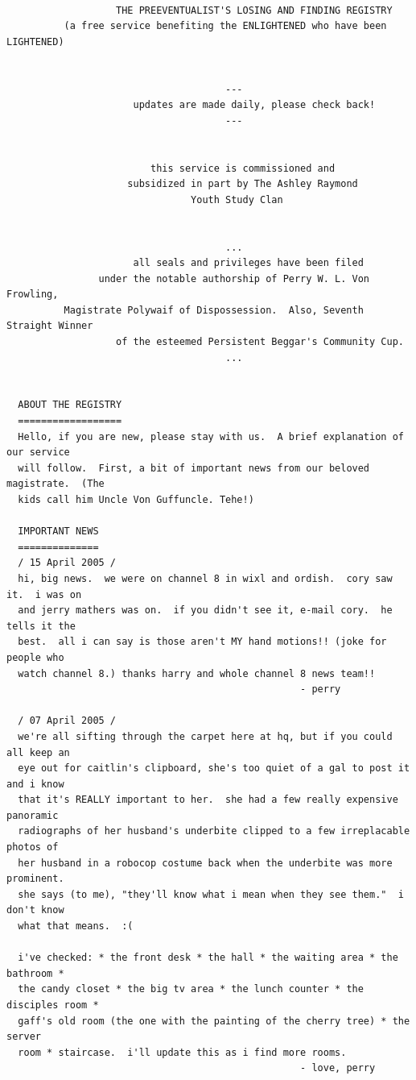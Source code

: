 \documentclass[10pt,twoside]{report}
\begin{document}
\begin{lstlisting}

                   THE PREEVENTUALIST'S LOSING AND FINDING REGISTRY
          (a free service benefiting the ENLIGHTENED who have been LIGHTENED)


                                      ---
                      updates are made daily, please check back!
                                      ---


                         this service is commissioned and
                     subsidized in part by The Ashley Raymond
                                Youth Study Clan


                                      ...
                      all seals and privileges have been filed
                under the notable authorship of Perry W. L. Von Frowling,
          Magistrate Polywaif of Dispossession.  Also, Seventh Straight Winner
                   of the esteemed Persistent Beggar's Community Cup.
                                      ...


  ABOUT THE REGISTRY
  ==================
  Hello, if you are new, please stay with us.  A brief explanation of our service
  will follow.  First, a bit of important news from our beloved magistrate.  (The
  kids call him Uncle Von Guffuncle. Tehe!)

  IMPORTANT NEWS
  ==============
  / 15 April 2005 /
  hi, big news.  we were on channel 8 in wixl and ordish.  cory saw it.  i was on
  and jerry mathers was on.  if you didn't see it, e-mail cory.  he tells it the
  best.  all i can say is those aren't MY hand motions!! (joke for people who
  watch channel 8.) thanks harry and whole channel 8 news team!!
                                                   - perry

  / 07 April 2005 /
  we're all sifting through the carpet here at hq, but if you could all keep an
  eye out for caitlin's clipboard, she's too quiet of a gal to post it and i know
  that it's REALLY important to her.  she had a few really expensive panoramic
  radiographs of her husband's underbite clipped to a few irreplacable photos of
  her husband in a robocop costume back when the underbite was more prominent.
  she says (to me), "they'll know what i mean when they see them."  i don't know
  what that means.  :(

  i've checked: * the front desk * the hall * the waiting area * the bathroom *
  the candy closet * the big tv area * the lunch counter * the disciples room *
  gaff's old room (the one with the painting of the cherry tree) * the server
  room * staircase.  i'll update this as i find more rooms.
                                                   - love, perry


\end{lstlisting}
\end{document}
